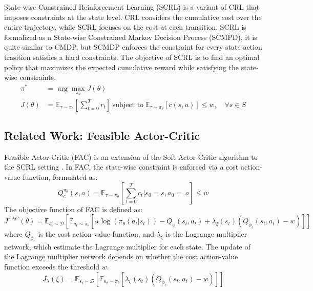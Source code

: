 State-wise Constrained Reinforcement Learning (SCRL) is a variant of CRL that imposes constraints at the state level.
CRL considers the cumulative cost over the entire trajectory, while SCRL focuses on the cost at each transition.
SCRL is formalized as a State-wise Constrained Markov Decision Process (SCMPD), it is quite similar to CMDP, but SCMDP enforces the constraint for every state action trasition satisfies a hard constraints.
The objective of SCRL is to find an optimal policy that maximizes the expected cumulative reward while satisfying the state-wise constraints.
\begin{equation}
  \begin{aligned}
    \pi^* &= \arg\max_{\pi_\theta} J(\theta) \\
    J(\theta) &= \mathbb{E}_{\tau \sim \pi_\theta} \left[ \sum^T_{t = 0} r_t \right] \; \text{subject to} \; \mathbb{E}_{\tau \sim \pi_\theta}  [c(s, a)] \leq w, \quad \forall s \in S
  \end{aligned}
\end{equation}

\subsection{Related Work: Feasible Actor-Critic}

Feasible Actor-Critic (FAC) is an extension of the Soft Actor-Critic algorithm to the SCRL setting \cite{FAC}.
In FAC, the state-wise constraint is enforced via a cost action-value function, formulated as:
\begin{equation}
  Q^{\pi_\theta}_c(s, a) = \mathbb{E}_{\tau \sim \pi_\theta}\left[\sum^T_{t = 0} c_t |s_0 = s, a_0 = ~a \right] \leq w
\end{equation}
The objective function of FAC is defined as:
\begin{equation}
  J^{\text{FAC}}(\theta) = \mathbb{E}_{s_t \sim \mathcal{D}} \left[ \mathbb{E}_{a_t \sim \pi_\theta} [\alpha \log(\pi_\theta(a_t|s_t)) - Q_\phi(s_t, a_t) + \lambda_\xi(s_t)\left( Q_{\phi_c}(s_t, a_t) - w \right) ] \right]
\end{equation}
where $Q_{\phi_c}$ is the cost action-value function, and $\lambda_\xi$ is the Lagrange multiplier network, which estimate the Lagrange multiplier for each state.
The update of the Lagrange multiplier network depends on whether the cost action-value function exceeds the threshold $w$.
\begin{equation}
  J_\lambda(\xi) = \mathbb{E}_{s_t \sim \mathcal{D}} \left[ \mathbb{E}_{a_t \sim \pi_\theta} \left[ \lambda_\xi(s_t) \left( Q_{\phi_c}(s_t, a_t) - w \right) \right] \right]
\end{equation}